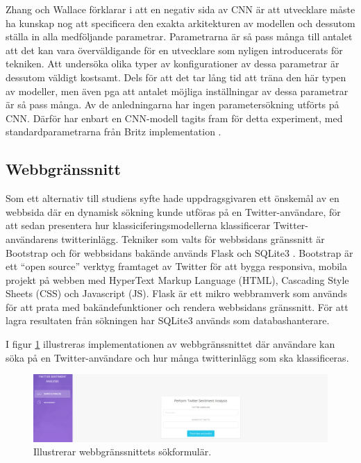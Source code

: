 \documentclass{kaumasters} %
\begin{document}
Zhang och Wallace förklarar i \cite{cnn:002} att en negativ sida av CNN är att utvecklare måste ha kunskap nog att specificera den exakta arkitekturen av modellen och dessutom ställa in alla medföljande parametrar.  Parametrarna är så pass många till antalet att det kan vara överväldigande för en utvecklare som nyligen introducerats för tekniken. Att undersöka olika typer av konfigurationer av dessa parametrar är dessutom väldigt kostsamt. Dels för att det tar lång tid att träna den här typen av modeller, men även pga att antalet möjliga inställningar av dessa parametrar är så pass många. Av de anledningarna har ingen parametersökning utförts på CNN. Därför har enbart en CNN-modell tagits fram för detta experiment, med standardparametrarna från Britz implementation \cite{impcnn:002}.






\subsection{Webbgränssnitt}
Som ett alternativ till studiens syfte hade uppdragsgivaren ett önskemål av en webbsida där en dynamisk sökning kunde utföras på en Twitter-användare, för att sedan presentera hur klassiciferingsmodellerna klassificerar Twitter-användarens twitterinlägg.
Tekniker som valts för webbsidans gränssnitt är Bootstrap \cite{gui:001} och för webbsidans bakände används Flask \cite{gui:002} och SQLite3 \cite{gui:003}.
Bootstrap är ett “open source” verktyg framtaget av Twitter för att bygga responsiva, mobila projekt på webben med HyperText Markup Language (HTML), Cascading Style Sheets (CSS) och Javascript (JS). Flask är ett mikro webbramverk som används för att prata med bakändefunktioner och rendera webbsidans gränssnitt. För att lagra resultaten från sökningen har SQLite3 används som databashanterare.

I figur \ref{fig:gui_form} illustreras implementationen av webbgränssnittet där användare kan söka på en Twitter-användare och hur många twitterinlägg som ska klassificeras.

\begin{figure}[H]
\includegraphics[width=12cm]{GUI_form}
\centering
\caption{Illustrerar webbgränssnittets sökformulär.}
\label{fig:gui_form}
\end{figure}
\end{document}
